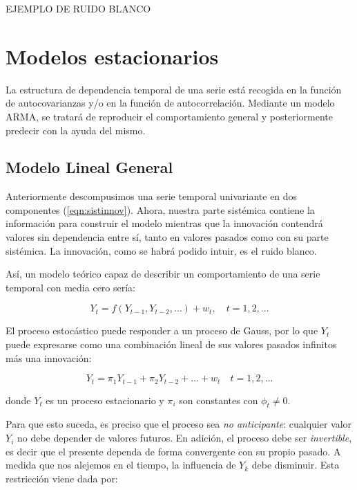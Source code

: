 \documentclass[a4paper,10pt]{article}
\begin{document}
EJEMPLO DE RUIDO BLANCO







\section{Modelos estacionarios}

La estructura de dependencia temporal de una serie está recogida en la función de autocovarianzas y/o en la función de autocorrelación. Mediante un modelo ARMA, se tratará de reproducir el comportamiento general y posteriormente predecir con la ayuda del mismo.

\subsection{Modelo Lineal General}

Anteriormente descompusimos una serie temporal univariante en dos componentes (\ref{eqn:sistinnov}). Ahora, nuestra parte sistémica contiene la información para construir el modelo mientras que la innovación contendrá valores sin dependencia entre sí, tanto en valores pasados como con su parte sistémica. La innovación, como se habrá podido intuir, es el ruido blanco.

Así, un modelo teórico capaz de describir un comportamiento de una serie temporal con media cero sería:

\begin{equation}
Y_t = f(Y_{t-1},Y_{t-2},...) + w_t, \quad t=1,2,...
\end{equation}

El proceso estocástico puede responder a un proceso de Gauss, por lo que $Y_t$ puede expresarse como una combinación lineal de sus valores pasados infinitos más una innovación:

\begin{equation}\label{eqn:ar}
Y_t = \pi_1 Y_{t-1} + \pi_2 Y_{t-2} + ... + w_t \quad t=1,2,...
\end{equation}

donde $Y_t$ es un proceso estacionario y $\pi_i$ son constantes con $\phi_t \neq 0$.

Para que esto suceda, es preciso que el proceso sea \textit{no anticipante}: cualquier valor $Y_i$ no debe depender de valores futuros. En adición, el proceso debe ser \textit{invertible}, es decir que el presente dependa de forma convergente con su propio pasado. A medida que nos alejemos en el tiempo, la influencia de $Y_k$ debe disminuir. Esta restricción viene dada por:
\end{document}
